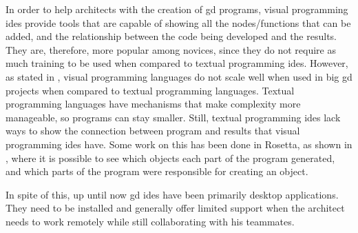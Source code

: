 In order to help architects with the creation of \gls{gd} programs, visual programming \glspl{ide} provide tools that are capable of showing all the nodes/functions that can be added, and the relationship between the code being developed and the results.
They are, therefore, more popular among novices, since they do not require as much training to be used when compared to textual programming \glspl{ide}.
However, as stated in \cite{leitao2012programming}, visual programming languages do not scale well when used in big \gls{gd} projects when compared to textual programming languages.
Textual programming languages have mechanisms that make complexity more manageable, so programs can stay smaller.
Still, textual programming \glspl{ide} lack ways to show the connection between program and results that visual programming \glspl{ide} have.
Some work on this has been done in Rosetta, as shown in \cite{de2012modern}, where it is possible to see which objects each part of the program generated, and which parts of the program were responsible for creating an object.

In spite of this, up until now \gls{gd} \glspl{ide} have been primarily desktop applications.
They need to be installed and generally offer limited support when the architect needs to work remotely while still collaborating with his teammates.




